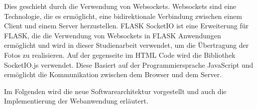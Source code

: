Dies geschieht durch die Verwendung von Websockets. Websockets sind eine Technologie, die es ermöglicht, eine bidirektionale Verbindung zwischen einem Client und einem Server herzustellen.
FLASK SocketIO ist eine Erweiterung für FLASK, die die Verwendung von Websockets in FLASK Anwendungen ermöglicht und wird in dieser Studienarbeit verwendet, um die Übertragung der Fotos zu realisieren. 
Auf der gegenseite im HTML Code wird die Bibliothek SocketIO.js verwendet. 
Diese Basiert auf der Programmiersprache JavaScript und ermöglicht die Kommunikation zwischen dem Browser und dem Server.

Im Folgenden wird die neue Softwarearchitektur vorgestellt und auch die Implementierung der Webanwendung erläutert.